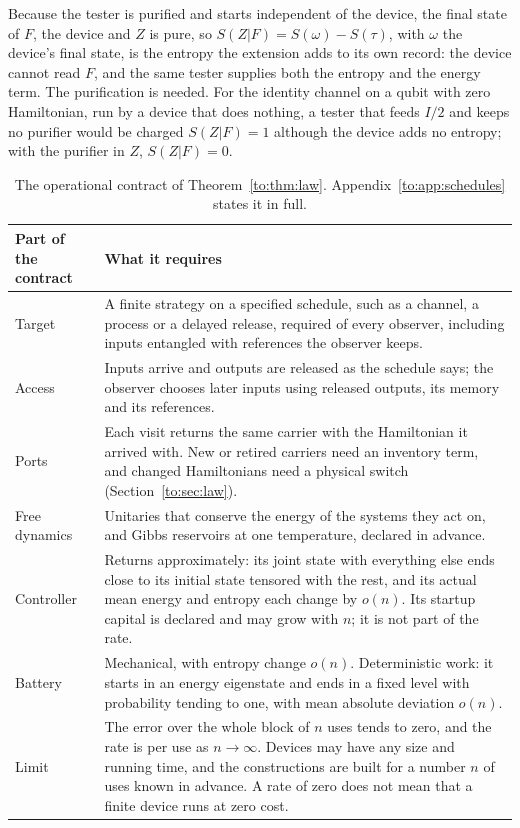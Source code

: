 Because the tester is purified and starts independent of the device, the final state of $F$, the device and $Z$ is pure, so $S(Z|F)=S(\omega)-S(\tau)$, with $\omega$ the device's final state, is the entropy the extension adds to its own record: the device cannot read $F$, and the same tester supplies both the entropy and the energy term. The purification is needed. For the identity channel on a qubit with zero Hamiltonian, run by a device that does nothing, a tester that feeds $I/2$ and keeps no purifier would be charged $S(Z|F)=1$ although the device adds no entropy; with the purifier in $Z$, $S(Z|F)=0$.

\begin{table}[tbp]
\centering
\small
\begin{tabular}{@{}>{\raggedright\arraybackslash}p{2.6cm}>{\raggedright\arraybackslash}p{12.2cm}@{}}
\toprule
Part of the contract & What it requires\\
\midrule
Target & A finite strategy on a specified schedule, such as a channel, a process or a delayed release, required of every observer, including inputs entangled with references the observer keeps.\\
Access & Inputs arrive and outputs are released as the schedule says; the observer chooses later inputs using released outputs, its memory and its references.\\
Ports & Each visit returns the same carrier with the Hamiltonian it arrived with. New or retired carriers need an inventory term, and changed Hamiltonians need a physical switch (Section~\ref{to:sec:law}).\\
Free dynamics & Unitaries that conserve the energy of the systems they act on, and Gibbs reservoirs at one temperature, declared in advance.\\
Controller & Returns approximately: its joint state with everything else ends close to its initial state tensored with the rest, and its actual mean energy and entropy each change by $o(n)$. Its startup capital is declared and may grow with $n$; it is not part of the rate.\\
Battery & Mechanical, with entropy change $o(n)$. Deterministic work: it starts in an energy eigenstate and ends in a fixed level with probability tending to one, with mean absolute deviation $o(n)$.\\
Limit & The error over the whole block of $n$ uses tends to zero, and the rate is per use as $n\to\infty$. Devices may have any size and running time, and the constructions are built for a number $n$ of uses known in advance. A rate of zero does not mean that a finite device runs at zero cost.\\
\bottomrule
\end{tabular}
\caption{The operational contract of Theorem~\ref{to:thm:law}. Appendix~\ref{to:app:schedules} states it in full.}\label{to:tab:contract}
\end{table}


